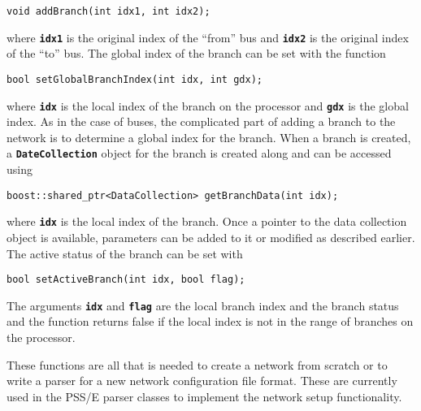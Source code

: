 {
\color{red}
\begin{Verbatim}[fontseries=b]
void addBranch(int idx1, int idx2);
\end{Verbatim}
}

where \texttt{\textbf{idx1}} is the original index of the ``from'' bus and \texttt{\textbf{idx2}} is the original index of the ``to'' bus. The global index of the branch can be set with the function

{
\color{red}
\begin{Verbatim}[fontseries=b]
bool setGlobalBranchIndex(int idx, int gdx);
\end{Verbatim}
}

where \texttt{\textbf{idx}} is the local index of the branch on the processor and \texttt{\textbf{gdx}} is the global index. As in the case of buses, the complicated part of adding a branch to the network is to determine a global index for the branch.
When a branch is created, a \texttt{\textbf{DateCollection}} object for the branch is created along and can be accessed using

{
\color{red}
\begin{Verbatim}[fontseries=b]
boost::shared_ptr<DataCollection> getBranchData(int idx);
\end{Verbatim}
}

where \texttt{\textbf{idx}} is the local index of the branch. Once a pointer to the data collection object is available, parameters can be added to it or modified as described earlier. The active status of the branch can be set with

{
\color{red}
\begin{Verbatim}[fontseries=b]
bool setActiveBranch(int idx, bool flag);
\end{Verbatim}
}

The arguments \texttt{\textbf{idx}} and \texttt{\textbf{flag}} are the local branch index and the branch status and the function returns false if the local index is not in the range of branches on the processor.

These functions are all that is needed to create a network from scratch or to write a parser for a new network configuration file format. These are currently used in the PSS/E parser classes to implement the network setup functionality.
